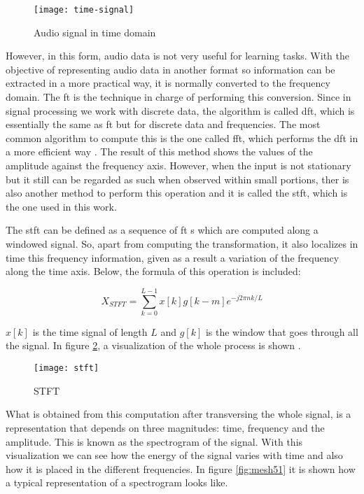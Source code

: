	\begin{figure}[H]
		\centering
		\captionsetup{justification=centering}
		\texttt{[image: time-signal]}
		\caption{Audio signal in time domain}
		\label{fig:mesh49}
	\end{figure}

	However, in this form, audio data is not very useful for learning tasks. With the objective of representing audio data in another format so information can be extracted in a more practical way, it is normally converted to the frequency domain. The \acrshort{ft} is the technique in charge of performing this conversion. Since in signal processing we work with discrete data, the algorithm is called \acrfull{dft}, which is essentially the same as \acrshort{ft} but for discrete data and frequencies. The most common algorithm to compute this is the one called \acrfull{fft}, which performs the \acrshort{dft} in a more efficient way \cite{Lei2016}. The result of this method shows the values of the amplitude against the frequency axis. However, when the input is not stationary but it still can be regarded as such when observed within small portions, ther is also another method to perform this operation and it is called the \acrfull{stft}, which is the one used in this work.
	
	The \acrshort{stft} can be defined as a sequence of \acrshort{ft} s which are computed along a windowed signal. So, apart from computing the transformation, it also localizes in time this frequency information, given as a result a variation of the frequency along the time axis. Below, the formula of this operation is included:
	
	\[ X_{STFT} =  \sum_{k=0}^{L-1} x[k]g[k-m]e^{-j2\pi n k/L}\]
	
	$x[k]$ is the time signal of length $L$ and $g[k]$ is the window that goes through all the signal. In figure \ref{fig:mesh50}, a visualization of the whole process is shown \cite{Kehtarnavaz2008}.
	
	\begin{figure}[H]
		\centering
		\captionsetup{justification=centering}
		\texttt{[image: stft]}
		\caption{STFT \cite{Gao2006}}
		\label{fig:mesh50}
	\end{figure}

	What is obtained from this computation after transversing the whole signal, is a representation that depends on three magnitudes: time, frequency and the amplitude. This is known as the spectrogram of the signal. With this visualization we can see how the energy of the signal varies with time and also how it is placed in the different frequencies. In figure \ref{fig:mesh51} it is shown how a typical representation of a spectrogram looks like. 
	
